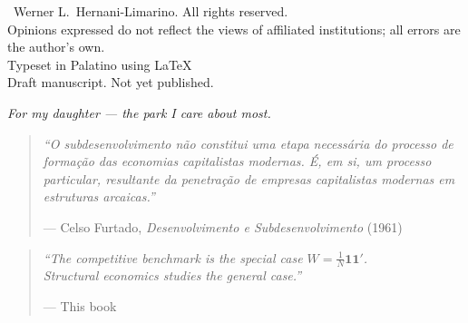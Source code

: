 \documentclass[12pt,a4paper,openright,twoside]{book}
\begin{document}
\thispagestyle{empty}
\vspace*{\fill}
\begin{small}
\noindent\textcopyright\ \the\year Werner L.\ Hernani-Limarino. All rights reserved.\\[1em]
\noindent Opinions expressed do not reflect the views of affiliated institutions; all errors are the author's own.\\[1em]
\noindent Typeset in Palatino using \LaTeX\\[1em]
\noindent Draft manuscript. Not yet published.
\end{small}
\clearpage


\thispagestyle{empty}
\vspace*{5cm}
\begin{center}
\textit{For my daughter --- the park I care about most.}
\end{center}
\clearpage


\thispagestyle{empty}
\vspace*{4cm}
\begin{quote}
\large\itshape
``O subdesenvolvimento n\~{a}o constitui uma etapa necess\'{a}ria do processo de forma\c{c}\~{a}o das economias capitalistas modernas. \'{E}, em si, um processo particular, resultante da penetra\c{c}\~{a}o de empresas capitalistas modernas em estruturas arcaicas.''

\vspace{1em}
\normalsize\upshape
\hfill --- Celso Furtado, \textit{Desenvolvimento e Subdesenvolvimento} (1961)
\end{quote}

\vspace{2cm}

\begin{quote}
\large\itshape
``The competitive benchmark is the special case $W = \frac{1}{N}\mathbf{11}'$.\\
Structural economics studies the general case.''

\vspace{1em}
\normalsize\upshape
\hfill --- This book
\end{quote}
\clearpage
\end{document}
